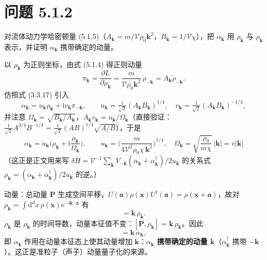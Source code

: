 \section*{问题 5.1.2}
\begin{problem}
对流体动力学哈密顿量 (5.1.5)（$A_{\pmb{k}}=m/\mathcal{V}\rho_0\pmb{k}^2$，$B_{\pmb{k}}=1/\mathcal{V}\chi$），把 $\alpha_{\pmb{k}}$ 用 $\rho_{\pmb{k}}$ 与 $\dot{\rho}_{\pmb{k}}$ 表示，并证明 $\alpha_{\pmb{k}}$ 携带确定的动量。
\end{problem}
\solution

以 $\rho_{\pmb{k}}$ 为正则坐标，由式 (5.1.4) 得正则动量
\begin{equation*}
\pi_{\pmb{k}}=\frac{\partial L}{\partial\dot{\rho}_{\pmb{k}}}
=\frac{m}{\mathcal{V}\rho_0\pmb{k}^{2}}\,\dot{\rho}_{-\pmb{k}}=A_{\pmb{k}}\dot{\rho}_{-\pmb{k}} .
\end{equation*}
仿照式 (3.3.17) 引入
\begin{equation*}
\alpha_{\pmb{k}}=u_{\pmb{k}}\rho_{\pmb{k}}+\mathrm{i}v_{\pmb{k}}\pi_{-\pmb{k}},
\qquad
u_{\pmb{k}}=\tfrac{1}{\sqrt2}(A_{\pmb{k}}B_{\pmb{k}})^{1/4},
\quad
v_{\pmb{k}}=\tfrac{1}{\sqrt2}(A_{\pmb{k}}B_{\pmb{k}})^{-1/4},
\end{equation*}
并注意 $\Omega_{\pmb{k}}=\sqrt{B_{\pmb{k}}/A_{\pmb{k}}}$，$A_{\pmb{k}}v_{\pmb{k}}=u_{\pmb{k}}/\Omega_{\pmb{k}}$（直接验证：$\tfrac1{\sqrt2}A^{3/4}B^{-1/4}=\tfrac1{\sqrt2}(AB)^{1/4}\sqrt{A/B}$），于是
\begin{equation*}
\boxed{\;\alpha_{\pmb{k}}=u_{\pmb{k}}\Big(\rho_{\pmb{k}}+\mathrm{i}\frac{\dot{\rho}_{\pmb{k}}}{\Omega_{\pmb{k}}}\Big),
\qquad
u_{\pmb{k}}=\Big(\frac{m}{4\mathcal{V}^{2}\rho_0\chi\,\pmb{k}^{2}}\Big)^{1/4},
\quad
\Omega_{\pmb{k}}=\sqrt{\frac{\rho_0}{m\chi}}\,|\pmb{k}|=v|\pmb{k}|\;}
\end{equation*}
（这正是正文用来写 $\delta H=\mathcal{V}^{-1}\sum_{\pmb{k}}V_{-\pmb{k}}(\alpha_{\pmb{k}}+\alpha_{\pmb{k}}^{\dagger})/2u_{\pmb{k}}$ 的关系式 $\rho_{\pmb{k}}=(\alpha_{\pmb{k}}+\alpha_{\pmb{k}}^{\dagger})/2u_{\pmb{k}}$ 的逆。）

动量：总动量 $\pmb{P}$ 生成空间平移，$U(\pmb{a})\rho(\pmb{x})U^{\dagger}(\pmb{a})=\rho(\pmb{x}+\pmb{a})$，故对 $\rho_{\pmb{k}}=\int\mathrm{d}^dx\,\rho(\pmb{x})\mathrm{e}^{-\mathrm{i}\pmb{k}\cdot\pmb{x}}$ 有
\begin{equation*}
[\pmb{P},\rho_{\pmb{k}}]=\pmb{k}\,\rho_{\pmb{k}} .
\end{equation*}
$\dot{\rho}_{\pmb{k}}$ 是 $\rho_{\pmb{k}}$ 的时间导数，动量本征值不变：$[\pmb{P},\dot{\rho}_{\pmb{k}}]=\pmb{k}\,\dot{\rho}_{\pmb{k}}$。因此
\begin{equation*}
[\pmb{P},\alpha_{\pmb{k}}]=\pmb{k}\,\alpha_{\pmb{k}} ,
\end{equation*}
即 $\alpha_{\pmb{k}}$ 作用在动量本征态上使其动量增加 $\pmb{k}$：\textbf{$\alpha_{\pmb{k}}$ 携带确定的动量 $\pmb{k}$}（$\alpha_{\pmb{k}}^{\dagger}$ 携带 $-\pmb{k}$）。这正是准粒子（声子）动量量子化的来源。

